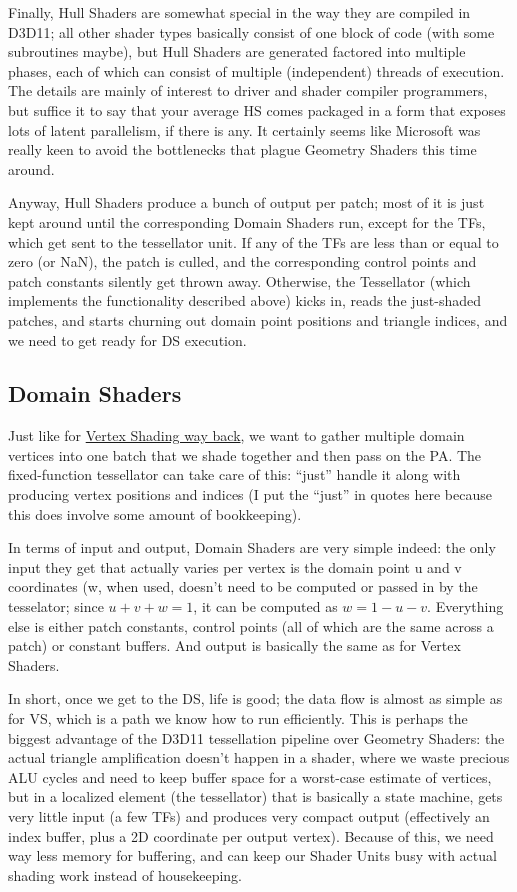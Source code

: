 \documentclass[12pt]{article}
\begin{document}
Finally, Hull Shaders are somewhat special in the way they are compiled in D3D11; all other shader types basically consist of one block of code (with some subroutines maybe), but Hull Shaders are generated factored into multiple phases, each of which can consist of multiple (independent) threads of execution. The details are mainly of interest to driver and shader compiler programmers, but suffice it to say that your average HS comes packaged in a form that exposes lots of latent parallelism, if there is any. It certainly seems like Microsoft was really keen to avoid the bottlenecks that plague Geometry Shaders this time around.

Anyway, Hull Shaders produce a bunch of output per patch; most of it is just kept around until the corresponding Domain Shaders run, except for the TFs, which get sent to the tessellator unit. If any of the TFs are less than or equal to zero (or NaN), the patch is culled, and the corresponding control points and patch constants silently get thrown away. Otherwise, the Tessellator (which implements the functionality described above) kicks in, reads the just-shaded patches, and starts churning out domain point positions and triangle indices, and we need to get ready for DS execution.

\subsection{Domain Shaders}
\label{sec:org8dedc68}

Just like for \href{https://fgiesen.wordpress.com/2011/07/03/a-trip-through-the-graphics-pipeline-2011-part-3/}{Vertex Shading way back}, we want to gather multiple domain vertices into one batch that we shade together and then pass on the PA. The fixed-function tessellator can take care of this: “just” handle it along with producing vertex positions and indices (I put the “just” in quotes here because this does involve some amount of bookkeeping).

In terms of input and output, Domain Shaders are very simple indeed: the only input they get that actually varies per vertex is the domain point u and v coordinates (w, when used, doesn’t need to be computed or passed in by the tesselator; since \(u+v+w=1\), it can be computed as \(w=1-u-v\). Everything else is either patch constants, control points (all of which are the same across a patch) or constant buffers. And output is basically the same as for Vertex Shaders.

In short, once we get to the DS, life is good; the data flow is almost as simple as for VS, which is a path we know how to run efficiently. This is perhaps the biggest advantage of the D3D11 tessellation pipeline over Geometry Shaders: the actual triangle amplification doesn’t happen in a shader, where we waste precious ALU cycles and need to keep buffer space for a worst-case estimate of vertices, but in a localized element (the tessellator) that is basically a state machine, gets very little input (a few TFs) and produces very compact output (effectively an index buffer, plus a 2D coordinate per output vertex). Because of this, we need way less memory for buffering, and can keep our Shader Units busy with actual shading work instead of housekeeping.
\end{document}
